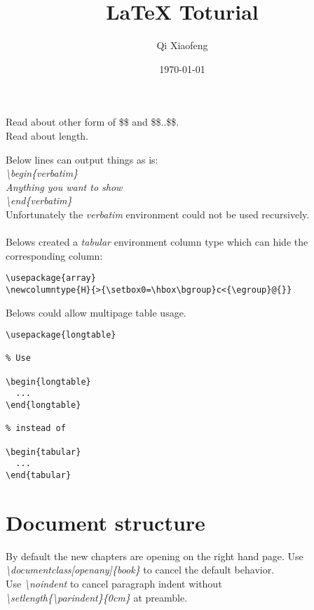 \documentclass[openany]{book}
\title{LaTeX Toturial}
\author{Qi Xiaofeng}
\date{\today}
\begin{document}

Read about other form of \$\$ and \$\$..\$\$.\\
Read about length.

Below lines can output things as is:\\
\textit{
\textbackslash{begin\{verbatim\}}\\
\hspace*{2ex}Anything you want to show\\
\textbackslash{end\{verbatim\}}
}\\
Unfortunately the \emph{verbatim} environment could not be used recursively.\\
\\
Belows created a \emph{tabular} environment column type which can hide the corresponding column:
{\scriptsize
\begin{verbatim}
\usepackage{array}
\newcolumntype{H}{>{\setbox0=\hbox\bgroup}c<{\egroup}@{}}
\end{verbatim}
}
Belows could allow multipage table usage.
{\scriptsize
\begin{verbatim}
\usepackage{longtable}

% Use

\begin{longtable}
  ...
\end{longtable}

% instead of

\begin{tabular}
  ...
\end{tabular}
\end{verbatim}
}

\chapter{Document structure}
By default the new chapters are opening on the right hand page. Use \textit{\scriptsize\textbackslash{}documentclass[openany]\{book\}} to cancel the default behavior.\\
Use {\footnotesize\textit{\textbackslash{noindent}}} to cancel paragraph indent without\\ {\scriptsize\textit{\textbackslash{setlength\{\textbackslash{parindent}\}\{0cm\}}}} at preamble.\\
\end{document}
